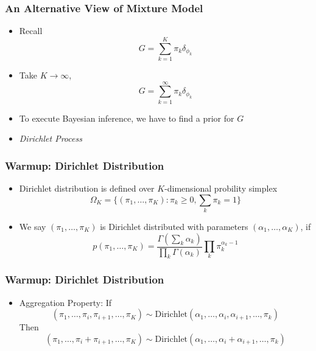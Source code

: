 \documentclass{beamer}
\begin{document}
\begin{frame}
	\frametitle{An Alternative View of Mixture Model}
	\begin{itemize}
		\item Recall
		\[
			G = \sum_{k=1}^{K}\pi_k\delta_{\phi_k}
		\]
		\item Take $K \rightarrow \infty$,
		\[
			G = \sum_{k=1}^{\infty}\pi_k\delta_{\phi_k}
		\]
		\item To execute Bayesian inference, we have to find a prior for $G$
		\pause
		\item {\em Dirichlet Process}
	\end{itemize}
\end{frame}

\begin{frame}
	\frametitle{Warmup: Dirichlet Distribution}
	\begin{itemize}
		\item Dirichlet distribution is defined over $K$-dimensional probility simplex
		\[
		\Omega_K=\{(\pi_1,\ldots,\pi_K): \pi_k\ge 0,\sum_k \pi_k =1 \}
		\]
		\item We say $(\pi_1,\ldots,\pi_K)$ is Dirichlet distributed with parameters $(\alpha_1, \ldots, \alpha_K)$, if
		\[
		p(\pi_1,\ldots,\pi_K)=\frac{\Gamma(\sum_k \alpha_k)}{\prod_k \Gamma(\alpha_k)}\prod_k \pi_k^{\alpha_k-1}
		\]
	\end{itemize}
\end{frame}

\begin{frame}
	\frametitle{Warmup: Dirichlet Distribution}
	\begin{itemize}
		\item {Aggregation Property:}
		If \[
			(\pi_1,\ldots,\pi_i, \pi_{i+1},\ldots, \pi_K) \sim \text{Dirichlet}(\alpha_1,\ldots,\alpha_i, \alpha_{i+1}, \ldots, \pi_k) 
		\]
		Then
		\[
		(\pi_1,\ldots,\pi_i+\pi_{i+1},\ldots, \pi_K) \sim \text{Dirichlet}(\alpha_1,\ldots,\alpha_i+ \alpha_{i+1}, \ldots, \pi_k) 
		\]
	\end{itemize}
\end{frame}
\end{document}
